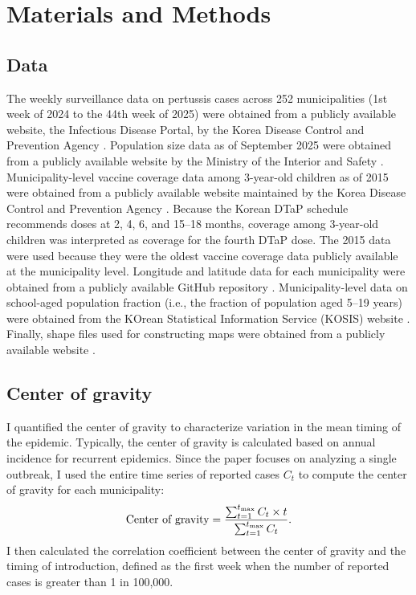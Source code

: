 \documentclass[12pt]{article}
\newcommand{\tsub}[2]{#1_{{\textrm{\tiny #2}}}}
\begin{document}
\section*{Materials and Methods}

\subsection*{Data}

The weekly surveillance data on pertussis cases across 252 municipalities (1st week of 2024 to the 44th week of 2025) were obtained from a publicly available website, the Infectious Disease Portal, by the Korea Disease Control and Prevention Agency \citep{kordata}.
Population size data as of September 2025 were obtained from a publicly available website by the Ministry of the Interior and Safety \citep{kordata2}.
Municipality-level vaccine coverage data among 3-year-old children as of 2015 were obtained from a publicly available website maintained by the Korea Disease Control and Prevention Agency \citep{kordata3}.
Because the Korean DTaP schedule recommends doses at 2, 4, 6, and 15--18 months, coverage among 3-year-old children was interpreted as coverage for the fourth DTaP dose.
The 2015 data were used because they were the oldest vaccine coverage data publicly available at the municipality level.
Longitude and latitude data for each municipality were obtained from a publicly available GitHub repository \citep{github1}.
Municipality-level data on school-aged population fraction (i.e., the fraction of population aged 5--19 years) were obtained from the KOrean Statistical Information Service (KOSIS) website \citep{kosis_population}.
Finally, shape files used for constructing maps were obtained from a publicly available website \citep{shape}.

\subsection*{Center of gravity}

I quantified the center of gravity to characterize variation in the mean timing of the epidemic.
Typically, the center of gravity is calculated based on annual incidence for recurrent epidemics.
Since the paper focuses on analyzing a single outbreak, I used the entire time series of reported cases $C_t$ to compute the center of gravity for each municipality:
\begin{equation}
\textrm{Center of gravity}=\frac{\sum_{t=1}^{\tsub{t}{max}} C_t \times t}{\sum_{t=1}^{\tsub{t}{max}} C_t}.
\end{equation}
I then calculated the correlation coefficient between the center of gravity and the timing of introduction, defined as the first week when the number of reported cases is greater than 1 in 100,000.
\end{document}
